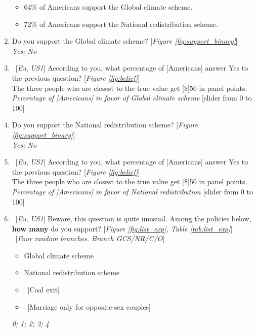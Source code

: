 \documentclass[12pt,english]{article}
\begin{document}
\begin{enumerate}[resume]
\begin{itemize} 
    \item 64\% of Americans support the Global climate scheme. 	
    \item 72\% of Americans support the National redistribution scheme. 
\end{itemize}
\item \label{q:gcs_support} Do you support the Global climate scheme? [\textit{Figure \ref{fig:support_binary}}]
\\ \textit{Yes; No}
\item ~[\textit{Eu}, \textit{US1}] \label{q:gcs_belief} According to you, what percentage of [Americans] answer Yes to the previous question? [\textit{Figure \ref{fig:belief}}]\\
The three people who are closest to the true value get [\$]50 in panel points.
\\ \textit{Percentage of [Americans] in favor of Global climate scheme} [slider from 0 to 100]
\item \label{q:nr_support} Do you support the National redistribution scheme? [\textit{Figure \ref{fig:support_binary}}]
\\ \textit{Yes; No}
\item ~[\textit{Eu}, \textit{US1}] \label{q:nr_belief} According to you, what percentage of [Americans] answer Yes to the previous question? [\textit{Figure \ref{fig:belief}}]\\
The three people who are closest to the true value get [\$]50 in panel points.
\\ \textit{Percentage of [Americans] in favor of National redistribution } [slider from 0 to 100]
\item ~[\textit{Eu}, \textit{US1}] \label{q:list_exp} Beware, this question is quite unusual. Among the policies below, \textbf{how many} do you support? [\textit{Figure \ref{fig:list_exp}, Table \ref{tab:list_exp}}]\\
~[\textit{Four random branches. Branch GCS/NR/C/O}] \\
\begin{itemize} \vspace{-1em}
    \item Global climate scheme 
    \item National redistribution scheme
    \item ~[Coal exit]  
    \item ~[Marriage only for opposite-sex couples]
\end{itemize}
\textit{0; 1; 2; 3; 4}\\

\end{enumerate}
\end{document}
